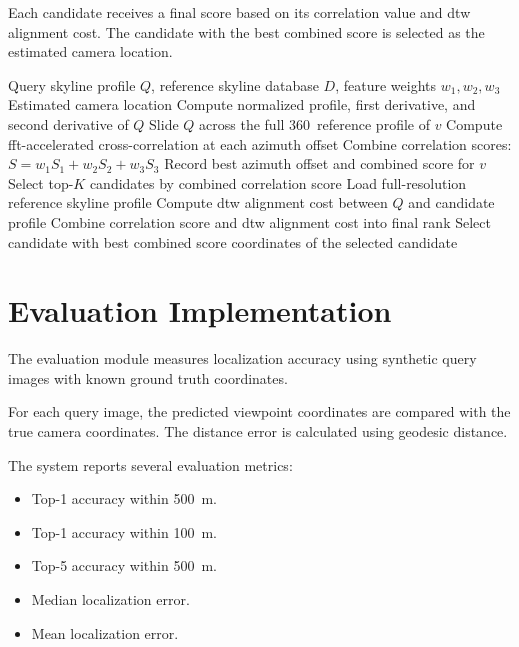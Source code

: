 Each candidate receives a final score based on its correlation value and \gls{dtw} alignment cost. The candidate with the best combined score is selected as the estimated camera location.

\begin{algorithm}[!ht]
\caption{Two-Stage Skyline Matching}
\label{alg:skyline_matching}
\begin{algorithmic}[1]
\Require Query skyline profile $Q$, reference skyline database $D$, feature weights $w_1, w_2, w_3$
\Ensure Estimated camera location
\State Compute normalized profile, first derivative, and second derivative of $Q$
\State {}
    \State Slide $Q$ across the full 360\textdegree\ reference profile of $v$
    \State Compute \gls{fft}-accelerated cross-correlation at each azimuth offset
    \State Combine correlation scores: $S = w_1 S_1 + w_2 S_2 + w_3 S_3$
    \State {}
    \State Record best azimuth offset and combined score for $v$
\EndFor
\State Select top-$K$ candidates by combined correlation score
\State {}
    \State Load full-resolution reference skyline profile
    \State Compute \gls{dtw} alignment cost between $Q$ and candidate profile
\EndFor
\State Combine correlation score and \gls{dtw} alignment cost into final rank
\State Select candidate with best combined score
\State \Return coordinates of the selected candidate
\end{algorithmic}
\end{algorithm}

\section{Evaluation Implementation}

The evaluation module measures localization accuracy using synthetic query images with known ground truth coordinates.

For each query image, the predicted viewpoint coordinates are compared with the true camera coordinates. The distance error is calculated using geodesic distance.

The system reports several evaluation metrics:

\begin{itemize}
    \item Top-1 accuracy within 500~m.
    \item Top-1 accuracy within 100~m.
    \item Top-5 accuracy within 500~m.
    \item Median localization error.
    \item Mean localization error.
\end{itemize}


